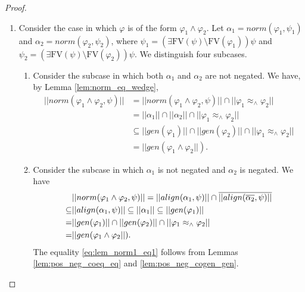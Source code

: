 \documentclass{lmcs}
\def\norm{norm}
\def\al{align}
\def\FV{\textrm{FV}}
\def\gen{gen}
\def\cogen{cogen}
\begin{document}
\begin{proof}
\begin{enumerate}
We have,  by the induction hypothesis, 
\begin{align*}
||\norm(\neg\varphi_1,\psi)||=\overline{||\norm(\varphi_1,\psi)||}\subseteq||\cogen(\varphi_1)||=||\gen(\neg\varphi_1)||. 
\end{align*}
Similarly, we have 
\begin{align*}
\overline{||\norm(\neg\varphi_1,\psi)||}=\overline{\overline{||\norm(\varphi_1,\psi)||}}=||\norm(\varphi_1,\psi)||\subseteq||\gen(\varphi_1)||=||\cogen(\neg\varphi_1)||. 
\end{align*}
\item Consider the case in which $\varphi$ is of the form $\varphi_1\wedge\varphi_2$. Let $\alpha_1=\norm(\varphi_1,\psi_1)$ and $\alpha_2=\norm(\varphi_2,\psi_2)$, where $\psi_1=(\exists\FV(\psi)\setminus\FV(\varphi_1))\psi$ and $\psi_2=(\exists\FV(\psi)\setminus\FV(\varphi_2))\psi$. We distinguish four subcases.
\begin{enumerate}
\item Consider the subcase in which both $\alpha_1$ and $\alpha_2$ are not negated. We have, by Lemma \ref{lem:norm_eq_wedge}, 
\begin{align*}
||\norm(\varphi_1\wedge\varphi_2,\psi)||&= ||\norm(\varphi_1\wedge\varphi_2,\psi)||\cap||\varphi_1\approx_\wedge\varphi_2||\\
&=||\alpha_1||\cap||\alpha_2||\cap||\varphi_1\approx_\wedge\varphi_2||\\
&\subseteq||\gen(\varphi_1)||\cap||\gen(\varphi_2)||\cap||\varphi_1\approx_\wedge\varphi_2||\\
&=||\gen(\varphi_1\wedge\varphi_2||).
\end{align*}
 
\item Consider the subcase in which $\alpha_1$ is not negated and $\alpha_2$ is negated.
We have
\begin{align}
&||\norm(\varphi_1\wedge\varphi_2,\psi)||=||\al(\alpha_1,\psi)||\cap\overline{||\al(\overline{\alpha_2},\psi)||}\notag\\
\subseteq&||\al(\alpha_1,\psi)||\subseteq||\alpha_1||\subseteq||\gen(\varphi_1)||\notag\\
= &||\gen(\varphi_1)||\cap||\gen(\varphi_2)||\cap||\varphi_1\approx_\wedge\varphi_2||\label{eq:lem_norm1_eq1}\\
=&||\gen(\varphi_1\wedge\varphi_2||).\notag
\end{align}
The equality \eqref{eq:lem_norm1_eq1} follows from Lemmas \ref{lem:pos_neg_coeq_eq} and \ref{lem:pos_neg_cogen_gen}.
 

\end{enumerate}
\end{enumerate}
\end{proof}
\end{document}
